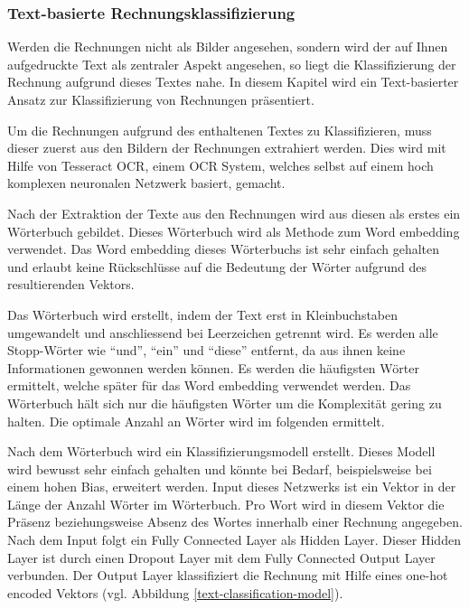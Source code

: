 \subsubsection{Text-basierte Rechnungsklassifizierung}
\label{chap:text-based-classification}

Werden die Rechnungen nicht als Bilder angesehen, sondern wird der auf Ihnen aufgedruckte Text als zentraler Aspekt angesehen, so liegt die Klassifizierung der Rechnung aufgrund dieses Textes nahe. In diesem Kapitel wird ein Text-basierter Ansatz zur Klassifizierung von Rechnungen präsentiert. 

Um die Rechnungen aufgrund des enthaltenen Textes zu Klassifizieren, muss dieser zuerst aus den Bildern der Rechnungen extrahiert werden. Dies wird mit Hilfe von Tesseract OCR, einem OCR System, welches selbst auf einem hoch komplexen neuronalen Netzwerk basiert, gemacht.

Nach der Extraktion der Texte aus den Rechnungen wird aus diesen als erstes ein Wörterbuch gebildet. Dieses Wörterbuch wird als Methode zum Word embedding verwendet. Das Word embedding dieses Wörterbuchs ist sehr einfach gehalten und erlaubt keine Rückschlüsse auf die Bedeutung der Wörter aufgrund des resultierenden Vektors.

Das Wörterbuch wird erstellt, indem der Text erst in Kleinbuchstaben umgewandelt und anschliessend bei Leerzeichen getrennt wird. Es werden alle Stopp-Wörter wie \enquote{und}, \enquote{ein} und \enquote{diese} entfernt, da aus ihnen keine Informationen gewonnen werden können. Es werden die häufigsten Wörter ermittelt, welche später für das Word embedding verwendet werden. Das Wörterbuch hält sich nur die häufigsten Wörter um die Komplexität gering zu halten. Die optimale Anzahl an Wörter wird im folgenden ermittelt.

Nach dem Wörterbuch wird ein Klassifizierungsmodell erstellt. Dieses Modell wird bewusst sehr einfach gehalten und könnte bei Bedarf, beispielsweise bei einem hohen Bias, erweitert werden. Input dieses Netzwerks ist ein Vektor in der Länge der Anzahl Wörter im Wörterbuch. Pro Wort wird in diesem Vektor die Präsenz beziehungsweise Absenz des Wortes innerhalb einer Rechnung angegeben. Nach dem Input folgt ein Fully Connected Layer als Hidden Layer. Dieser Hidden Layer ist durch einen Dropout Layer mit dem Fully Connected Output Layer verbunden. Der Output Layer klassifiziert die Rechnung mit Hilfe eines one-hot encoded Vektors (vgl. Abbildung \ref{text-classification-model}). 

